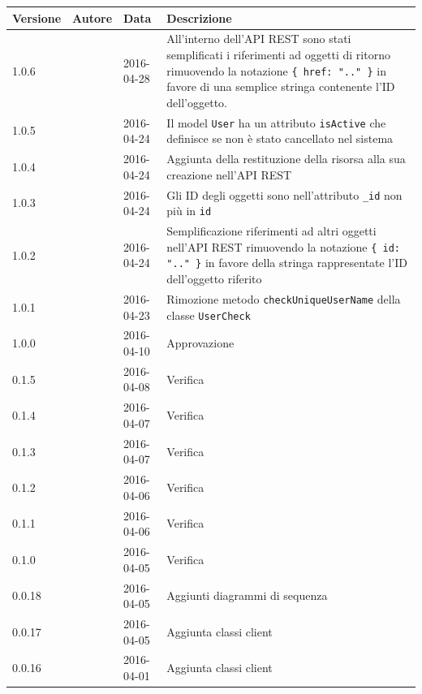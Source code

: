 \documentclass[12pt,a4paper]{article}
\begin{document}
\begin{center}
	\begin{longtable}[H]{p{} p{} p{} p{}}
		\toprule
		\textbf{Versione}	&	\textbf{Autore}	&	\textbf{Data}	&	\textbf{Descrizione}\\*
		\midrule
		\midrule
		1.0.6 & \TP{} & 2016-04-28 & All'interno dell'API REST sono stati semplificati i riferimenti ad oggetti di ritorno rimuovendo la notazione \texttt{\{ href: ".." \}} in favore di una semplice stringa contenente l'ID dell'oggetto. \\*
		\midrule
		1.0.5 & \TP{} & 2016-04-24 & Il model \texttt{User} ha un attributo \texttt{isActive} che definisce se non è stato cancellato nel sistema \\*
		\midrule
		1.0.4 & \TP{} & 2016-04-24 & Aggiunta della restituzione della risorsa alla sua creazione nell'API REST \\*
		\midrule
		\midrule
		1.0.3 & \TP{} & 2016-04-24 & Gli ID degli oggetti sono nell'attributo \texttt{\_id} non più in \texttt{id} \\*
		\midrule
		1.0.2 & \TP{} & 2016-04-24 & Semplificazione riferimenti ad altri oggetti nell'API REST
			rimuovendo la notazione \texttt{\{ id: ".." \}} in favore della stringa rappresentate l'ID dell'oggetto
			riferito \\*
		\midrule
		1.0.1 & \TP{} & 2016-04-23 & Rimozione metodo \texttt{checkUniqueUserName} della classe
			\texttt{UserCheck} \\*
		\midrule
		1.0.0 & \TP{} & 2016-04-10 & Approvazione \\*
		\midrule
		0.1.5 & \NDC{} & 2016-04-08 & Verifica \\*
		\midrule
		0.1.4 & \WS{} & 2016-04-07 & Verifica \\*
		\midrule
		0.1.3 & \AVE{} & 2016-04-07 & Verifica \\*
		\midrule
		0.1.2 & \AVI{} & 2016-04-06 & Verifica \\*
		\midrule
		0.1.1 & \AB{} & 2016-04-06 & Verifica \\*
		\midrule
		0.1.0 & \IB{} & 2016-04-05 & Verifica \\*
		\midrule
		0.0.18 & \NDC{} & 2016-04-05 & Aggiunti diagrammi di sequenza \\*
		\midrule
		0.0.17 & \IB{} & 2016-04-05 & Aggiunta classi client \\*
		\midrule
		0.0.16 & \WS{} & 2016-04-01 & Aggiunta classi client \\*
		\midrule

\end{longtable}
\end{center}
\end{document}
